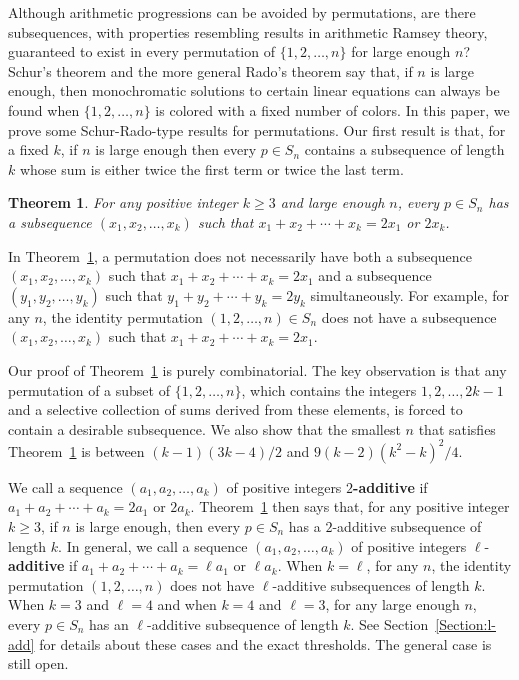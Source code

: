 \documentclass[11pt]{article}
\newtheorem{theorem}{Theorem}[section]
\theoremstyle{definition}
\begin{document}
Although arithmetic progressions can be avoided by permutations, are there subsequences, with properties resembling results in arithmetic Ramsey theory, guaranteed to exist in every permutation of $\{1,2,\ldots,n\}$ for large enough $n$? Schur's theorem \cite[Chapter 8]{LandmanRobertson2014} and the more general Rado's theorem \cite[Chapter 9]{LandmanRobertson2014} say that, if $n$ is large enough, then monochromatic solutions to certain linear equations can always be found when $\{1,2,\ldots,n\}$ is colored with a fixed number of colors. In this paper, we prove some Schur-Rado-type results for permutations. Our first result is that, for a fixed $k$, if $n$ is large enough then every $p\in S_n$ contains a subsequence of length $k$ whose sum is either twice the first term or twice the last term.

\begin{theorem}\label{Theorem:Main}
    For any positive integer $k\geq3$ and large enough $n$, every $p\in S_n$ has a subsequence $(x_1,x_2,\ldots,x_k)$ such that $x_1+x_2+\cdots+x_k=2 x_1$ or $2x_k$.
\end{theorem}
In Theorem~\ref{Theorem:Main}, a permutation does not necessarily have both a subsequence $(x_1,x_2,\ldots,x_k)$ such that $x_1+x_2+\cdots+x_k=2 x_1$ and a subsequence $(y_1,y_2,\ldots,y_k)$ such that $y_1+y_2+\cdots+y_k=2 y_k$ simultaneously. For example, for any $n$, the identity permutation $(1,2,\ldots,n)\in S_n$ does not have a subsequence $(x_1,x_2,\ldots,x_k)$ such that $x_1+x_2+\cdots+x_k=2 x_1$. 

Our proof of Theorem~\ref{Theorem:Main} is purely combinatorial. The key observation is that any permutation of a subset of $\{1,2,\ldots,n\}$, which contains the integers $1,2,\ldots,2k-1$ and a selective collection of sums derived from these elements, is forced to contain a desirable subsequence. We also show that the smallest $n$ that satisfies Theorem~\ref{Theorem:Main} is between $(k-1)(3k-4)/2$ and $9(k-2)(k^2-k)^2/4$. 

We call a sequence $(a_1,a_2,\ldots,a_k)$ of positive integers \textbf{$2$-additive} if $a_1+a_2+\cdots+a_k=2a_1$ or $2a_k$. Theorem~\ref{Theorem:Main} then says that, for any positive integer $k\geq3$, if $n$ is large enough, then every $p\in S_n$ has a $2$-additive subsequence of length $k$. In general, we call a sequence $(a_1,a_2,\ldots,a_k)$  of positive integers $\ell$-\textbf{additive} if $a_1+a_2+\cdots+a_k=\ell a_1$ or $\ell a_k$. When $k=\ell$, for any $n$, the identity permutation $(1,2,\ldots,n)$ does not have $\ell$-additive subsequences of length $k$. When $k=3$ and $\ell=4$ and when $k=4$ and $\ell=3$, for any large enough $n$, every $p\in S_n$ has an $\ell$-additive subsequence of length $k$. See Section~\ref{Section:l-add} for details about these cases and the exact thresholds. The general case is still open.
\end{document}
